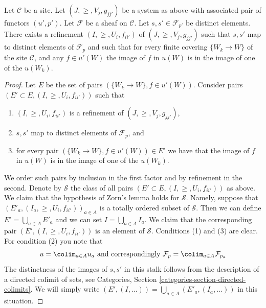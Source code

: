 \begin{lemma}
\label{lemma-refine-all-at-once}
Let $\mathcal{C}$ be a site.
Let $(J, \geq, V_j, g_{jj'})$ be a system as above with associated
pair of functors $(u', p')$.
Let $\mathcal{F}$ be a sheaf on $\mathcal{C}$.
Let $s, s' \in \mathcal{F}_{p'}$ be distinct elements.
There exists a refinement $(I, \geq, U_i, f_{ii'})$
of $(J, \geq, V_j, g_{jj'})$ such that $s, s'$ map
to distinct elements of $\mathcal{F}_p$ and such that
for every finite covering $\{W_k \to W\}$ of the site
$\mathcal{C}$, and any $f \in u'(W)$ the image of $f$ in $u(W)$
is in the image of one of the $u(W_k)$.
\end{lemma}

\begin{proof}
Let $E$ be the set of pairs $(\{W_k \to W\}, f\in u'(W))$.
Consider pairs $(E' \subset E, (I, \geq, U_i, f_{ii'}))$
such that
\begin{enumerate}
\item $(I, \geq, U_i, f_{ii'})$ is a refinement of $(J, \geq, V_j, g_{jj'})$,
\item $s, s'$ map to distinct elements of $\mathcal{F}_p$, and
\item for every pair $(\{W_k \to W\}, f\in u'(W)) \in E'$ we have that
the image of $f$ in $u(W)$ is in the image of one of the $u(W_k)$.
\end{enumerate}
We order such pairs by inclusion in the first factor and
by refinement in the second. Denote by $\mathcal{S}$ the class
of all pairs $(E' \subset E, (I, \geq, U_i, f_{ii'}))$ as above.
We claim that the hypothesis of Zorn's lemma holds for $\mathcal{S}$. Namely,
suppose that $(E'_a, (I_a, \geq, U_i, f_{ii'}))_{a \in A}$
is a totally ordered subset of $\mathcal{S}$. Then we can define
$E' = \bigcup_{a \in A} E'_a$ and we can set $I = \bigcup_{a \in A} I_a$.
We claim that the corresponding pair
$(E' , (I, \geq, U_i, f_{ii'}))$ is an element of $\mathcal{S}$.
Conditions (1) and (3) are clear. For condition (2) you note
that
$$
u = \colim_{a \in A} u_a
\text{ and correspondingly }
\mathcal{F}_p = \colim_{a \in A} \mathcal{F}_{p_a}
$$
The distinctness of the images of $s, s'$ in this stalk follows
from the description of a directed colimit of sets, see
Categories, Section \ref{categories-section-directed-colimits}.
We will simply write
$(E', (I, \ldots)) = \bigcup_{a \in A}(E'_a, (I_a, \ldots))$
in this situation.


\end{proof}

